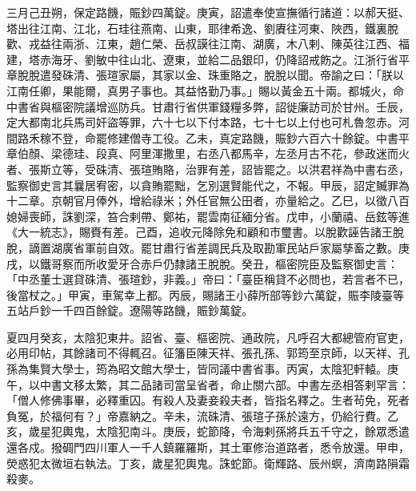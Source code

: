 \begin{pinyinscope}
 三月己丑朔，保定路饑，賑鈔四萬錠。庚寅，詔遣奉使宣撫循行諸道：以郝天挺、塔出往江南、江北，石珪往燕南、山東，耶律希逸、劉賡往河東、陜西，鐵裏脫歡、戎益往兩浙、江東，趙仁榮、岳叔謨往江南、湖廣，木八剌、陳英往江西、福建，塔赤海牙、劉敏中往山北、遼東，並給二品銀印，仍降詔戒飭之。江浙行省平章脫脫遣發硃清、張瑄家屬，其家以金、珠重賂之，脫脫以聞。帝諭之曰：「朕以江南任卿，果能爾，真男子事也。其益恪勤乃事。」賜以黃金五十兩。都城火，命中書省與樞密院議增巡防兵。甘肅行省供軍錢糧多弊，詔徙廉訪司於甘州。壬辰，定大都南北兵馬司奸盜等罪，六十七以下付本路，七十七以上付也可札魯忽赤。河間路禾稼不登，命罷修建僧寺工役。乙未，真定路饑，賑鈔六百六十餘錠。中書平章伯顏、梁德珪、段真、阿里渾撒里，右丞八都馬辛，左丞月古不花，參政迷而火者、張斯立等，受硃清、張瑄賄賂，治罪有差，詔皆罷之。以洪君祥為中書右丞，監察御史言其曩居宥密，以貪賄罷黜，乞別選賢能代之，不報。甲辰，詔定贓罪為十二章。京朝官月俸外，增給祿米；外任官無公田者，亦量給之。乙巳，以徵八百媳婦喪師，誅劉深，笞合剌帶、鄭祐，罷雲南征緬分省。戊申，小蘭禧、岳鉉等進《大一統志》，賜賚有差。己酉，追收元降除免和顧和市璽書。以脫歡誣告諸王脫脫，謫置湖廣省軍前自效。罷甘肅行省差調民兵及取勘軍民站戶家屬孳畜之數。庚戌，以鐵哥察而所收愛牙合赤戶仍隸諸王脫脫。癸丑，樞密院臣及監察御史言：「中丞董士選貸硃清、張瑄鈔，非義。」帝曰：「臺臣稱貸不必問也，若言者不已，後當杖之。」甲寅，車駕幸上都。丙辰，賜諸王小薛所部等鈔六萬錠，賑李陵臺等五站戶鈔一千四百餘錠。遼陽等路饑，賑鈔萬錠。



 夏四月癸亥，太陰犯東井。詔省、臺、樞密院、通政院，凡呼召大都總管府官吏，必用印帖，其餘諸司不得輒召。征籓臣陳天祥、張孔孫、郭筠至京師，以天祥、孔孫為集賢大學士，筠為昭文館大學士，皆同議中書省事。丙寅，太陰犯軒轅。庚午，以中書文移太繁，其二品諸司當呈省者，命止關六部。中書左丞相答剌罕言：「僧人修佛事畢，必釋重囚。有殺人及妻妾殺夫者，皆指名釋之。生者茍免，死者負冤，於福何有？」帝嘉納之。辛未，流硃清、張瑄子孫於遠方，仍給行費。乙亥，歲星犯輿鬼，太陰犯南斗。庚辰，蛇節降，令海剌孫將兵五千守之，餘眾悉遣還各戍。撥碉門四川軍人一千人鎮羅羅斯，其土軍修治道路者，悉令放還。甲申，熒惑犯太微垣右執法。丁亥，歲星犯輿鬼。誅蛇節。衛輝路、辰州螟，濟南路隕霜殺麥。




\end{pinyinscope}
